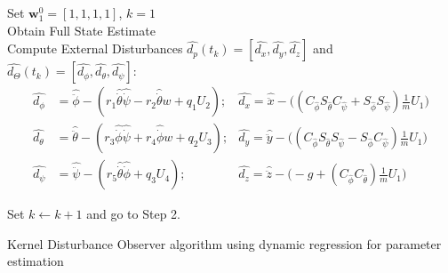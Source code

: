 \documentclass[letterpaper%
, twoside%
, 12pt%
,memoire%
, english%
,creativecommons,hyperref%
]{thETS}
\let\oldnl\nl%
\newcommand{\nonl}{\renewcommand{\nl}{\let\nl\oldnl}}%
\begin{document}
\begin{algorithm}  %
\SetAlgoLined
{}
Set $\mathbf{w}_{1}^{0}= [1, 1, 1, 1]$, $k=1$ \\
Obtain Full State Estimate \\
\nonl {}
Compute External Disturbances $\hat{d_p}(t_k)=[\hat{d_x},\hat{d_y},\hat{d_z}]$ and $\hat{d_\Theta}(t_k)=[\hat{d_\phi},\hat{d_\theta},\hat{d_\psi}]$: 
	\[
		\begin{aligned}
    \hat{d_\phi}&=\hat{\ddot{\phi}}-(r_1\hat{\dot{\theta}}\hat{\dot{\psi}}-r_2\hat{\dot{\theta}}w+q_1U_2); &\hat{d_x}=\hat{\ddot{x}}-\Big((C_{\hat{\phi}}S_{\hat{\theta}}C_{\hat{\psi}}+S_{\hat{\phi}}S_{\hat{\psi}})\frac{1}{m}U_1\Big)\\
    \hat{d_\theta}&=\hat{\ddot{\theta}}-(r_3\hat{\dot{\phi}}\hat{\dot{\psi}}+r_4\hat{\dot{\phi}}w+q_2U_3);  &\hat{d_y}=\hat{\ddot{y}}-\Big((C_{\hat{\phi}}S_{\hat{\theta}}S_{\hat{\psi}}-S_{\hat{\phi}}C_{\hat{\psi}})\frac{1}{m}U_1\Big)\\
    \hat{d_\psi}&=\hat{\ddot{\psi}}-(r_5\hat{\dot{\theta}}\hat{\dot{\phi}}+q_3U_4); &\hat{d_z}=\hat{\ddot{z}}-\Big(-g+(C_{\hat{\phi}}C_{\hat{\theta}})\frac{1}{m}U_1\Big)
    \end{aligned}
	\]

Set $k \gets k+1$ and go to Step 2.
\caption{Kernel Disturbance Observer algorithm using dynamic regression for parameter estimation \label{algo:1}}
\end{algorithm}
\end{document}
